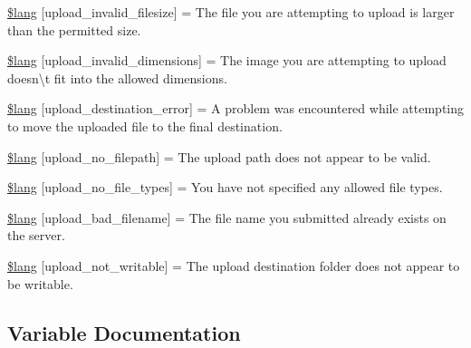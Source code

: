 \begin{DoxyCompactItemize}
\item 
\mbox{\hyperlink{upload__lang_8php_a9e27dcfe81917319e2dccfbec17161eb}{\$lang}} \mbox{[}\textquotesingle{}upload\+\_\+invalid\+\_\+filesize\textquotesingle{}\mbox{]} = \textquotesingle{}The file you are attempting to upload is larger than the permitted size.\textquotesingle{}
\item 
\mbox{\hyperlink{upload__lang_8php_a4055120be986694e0ff7d696e26d9395}{\$lang}} \mbox{[}\textquotesingle{}upload\+\_\+invalid\+\_\+dimensions\textquotesingle{}\mbox{]} = \textquotesingle{}The image you are attempting to upload doesn\textbackslash{}\textquotesingle{}t fit into the allowed dimensions.\textquotesingle{}
\item 
\mbox{\hyperlink{upload__lang_8php_ae65b8eeac589242cd57cecdb023f4564}{\$lang}} \mbox{[}\textquotesingle{}upload\+\_\+destination\+\_\+error\textquotesingle{}\mbox{]} = \textquotesingle{}A problem was encountered while attempting to move the uploaded file to the final destination.\textquotesingle{}
\item 
\mbox{\hyperlink{upload__lang_8php_a8f360e9254fa8e42d23c2261fa613505}{\$lang}} \mbox{[}\textquotesingle{}upload\+\_\+no\+\_\+filepath\textquotesingle{}\mbox{]} = \textquotesingle{}The upload path does not appear to be valid.\textquotesingle{}
\item 
\mbox{\hyperlink{upload__lang_8php_a36a638dbb92bbafa88689e777b5d0a67}{\$lang}} \mbox{[}\textquotesingle{}upload\+\_\+no\+\_\+file\+\_\+types\textquotesingle{}\mbox{]} = \textquotesingle{}You have not specified any allowed file types.\textquotesingle{}
\item 
\mbox{\hyperlink{upload__lang_8php_a26c58f27f690177bbe6e096348076d0e}{\$lang}} \mbox{[}\textquotesingle{}upload\+\_\+bad\+\_\+filename\textquotesingle{}\mbox{]} = \textquotesingle{}The file name you submitted already exists on the server.\textquotesingle{}
\item 
\mbox{\hyperlink{upload__lang_8php_a3cd474af7c7e6c1d7f28342914cdae40}{\$lang}} \mbox{[}\textquotesingle{}upload\+\_\+not\+\_\+writable\textquotesingle{}\mbox{]} = \textquotesingle{}The upload destination folder does not appear to be writable.\textquotesingle{}
\end{DoxyCompactItemize}


\subsection{Variable Documentation}
\mbox{\label{upload__lang_8php_aa4b26b58d6f43453951a13be6cc0b518}} 
